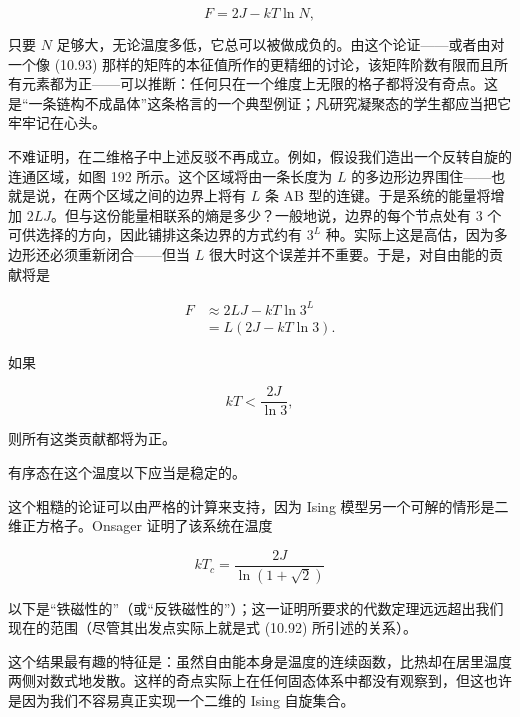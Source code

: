 \begin{equation*}
F = 2J - kT\ln N,
\tag{10.96}
\end{equation*}


只要 $N$ 足够大，无论温度多低，它总可以被做成负的。由这个论证——或者由对一个像 (10.93) 那样的矩阵的本征值所作的更精细的讨论，该矩阵阶数有限而且所有元素都为正——可以推断：任何只在一个维度上无限的格子都将没有奇点。这是“一条链构不成晶体”这条格言的一个典型例证；凡研究凝聚态的学生都应当把它牢牢记在心头。

不难证明，在二维格子中上述反驳不再成立。例如，假设我们造出一个反转自旋的连通区域，如图 192 所示。这个区域将由一条长度为 $L$ 的多边形边界围住——也就是说，在两个区域之间的边界上将有 $L$ 条 AB 型的连键。于是系统的能量将增加 $2LJ$。但与这份能量相联系的熵是多少？一般地说，边界的每个节点处有 3 个可供选择的方向，因此铺排这条边界的方式约有 $3^L$ 种。实际上这是高估，因为多边形还必须重新闭合——但当 $L$ 很大时这个误差并不重要。于是，对自由能的贡献将是

\begin{align*}
F &\approx 2LJ - kT\ln 3^L\\
&= L(2J - kT\ln 3).
\tag{10.97}
\end{align*}


如果

\begin{equation*}
kT < \frac{2J}{\ln 3},
\tag{10.98}
\end{equation*}

则所有这类贡献都将为正。

有序态在这个温度以下应当是稳定的。

这个粗糙的论证可以由严格的计算来支持，因为 Ising 模型另一个可解的情形是二维正方格子。Onsager 证明了该系统在温度

\begin{equation*}
kT_c = \frac{2J}{\ln(1+\sqrt{2})}
\tag{10.99}
\end{equation*}

以下是“铁磁性的”（或“反铁磁性的”）；这一证明所要求的代数定理远远超出我们现在的范围（尽管其出发点实际上就是式 (10.92) 所引述的关系）。

这个结果最有趣的特征是：虽然自由能本身是温度的连续函数，比热却在居里温度两侧对数式地发散。这样的奇点实际上在任何固态体系中都没有观察到，但这也许是因为我们不容易真正实现一个二维的 Ising 自旋集合。


